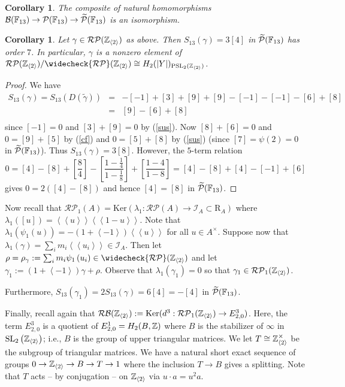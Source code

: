 \documentclass[12pt]{amsart}
\newtheorem{cor}[lem]{Corollary}
\theoremstyle{definition}
\newcommand{\F}[1]{\Bbb{F}_{#1}}
\newcommand{\Z}{\Bbb{Z}}
\newcommand{\spl}[2]{\operatorname{SL}_{#1}\left(#2\right)}
\newcommand{\pspl}[2]{\mathrm{PSL}_{#1}(#2)}
\newcommand{\pb}[1]{\mathcal{P}(#1)}%
\newcommand{\qpb}[1]{\widetilde{\mathcal{P}}(#1)}%
\newcommand{\rpb}[1]{\mathcal{RP}(#1)}%
\newcommand{\rpbker}[1]{\mathcal{RP}_1(#1)}%
\newcommand{\crpb}[1]{\widecheck{\mathcal{RP}}(#1)}
\newcommand{\bl}[1]{\mathcal{B}(#1)}%
\newcommand{\rbl}[1]{{\mathcal{RB}}(#1)}%
\newcommand{\gpb}[1]{\left[ #1\right]} %
\newcommand{\sus}[1]{\psi(#1) }%
\newcommand{\suss}[2]{\psi_{#1}\left( #2\right)}
\newcommand{\<}{\langle}
\renewcommand{\>}{\rangle}
\renewcommand{\ker}[1]{\mathrm{Ker}(#1)}
\newcommand{\sgr}[1]{\mathrm{R}_{#1}}%
\newcommand{\an}[1]{\left\langle{#1}\right\rangle}
\newcommand{\pf}[1]{\left\langle\!\left\langle{#1}\right\rangle\!\right\rangle}
\newcommand{\aug}[1]{\mathcal{I}_{#1}}
\begin{document}
\begin{cor}  The composite of natural homomorphisms $\bl{\F{13}}\to\pb{\F{13}}\to\qpb{\F{13}}$ is an isomorphism.
\end{cor}

\begin{cor}  Let $\gamma\in \rpb{\Z_{\an{2}}}$ as above. Then $S_{13}(\gamma)=3\gpb{4}$ in $\qpb{\F{13}}$ has order $7$. In particular, $\gamma$ is a nonzero element of
$\rpb{\Z_{\an{2}}}/\crpb{\Z_{\an{2}}}\cong H_2(|Y|)_{\pspl{2}{\Z_{\an{2}}}}$.
\end{cor}

\begin{proof} We have 
\begin{eqnarray*}
S_{13}(\gamma)=S_{13}(D(\tilde{\gamma}))&=&-\gpb{-1}+\gpb{3}+\gpb{9}+\gpb{9}-\gpb{-1}-\gpb{-1}-\gpb{6}+\gpb{8}\\
&=& \gpb{9}-\gpb{6}+\gpb{8}\\
\end{eqnarray*}
since $\gpb{-1}=0$ and $\gpb{3}+\gpb{9}=0$ by (\ref{sus}). Now $\gpb{8}+\gpb{6}=0$  and $0=\gpb{9}+\gpb{5}$ by (\ref{cf}) and $0=\gpb{5}+\gpb{8}$ by (\ref{sus}) (since $\gpb{7}=\sus{2}=0$ in $\qpb{\F{13}}$). Thus $S_{13}(\gamma)=3\gpb{8}$. However, the $5$-term relation
\[
0=\gpb{4}-\gpb{8}+\gpb{\frac{8}{4}}-\gpb{\frac{1-\frac{1}{4}}{1-\frac{1}{8}}}+\gpb{\frac{1-4}{1-8}}=\gpb{4}-\gpb{8}+\gpb{4}-\gpb{-1}+\gpb{6}
\]
gives $0=2(\gpb{4}-\gpb{8})$  and hence $\gpb{4}=\gpb{8}$ in $\qpb{\F{13}}$.
\end{proof}

Now recall that $\rpbker{A}=\ker{\lambda_1:\rpb{A}\to \aug{A}\subset\sgr{A}}$ where $\lambda_1(\gpb{u})=\pf{u}\pf{1-u}$. Note that $\lambda_1(\suss{1}{u})=-(1+\an{-1})\pf{u}$ for all 
$u\in A^\times$. Suppose now that $\lambda_1(\gamma)=\sum_im_i\pf{u_i}\in\aug{A}$. Then let $\rho=\rho_\gamma:=\sum_im_i\suss{1}{u_i}\in \crpb{\Z_{\an{2}}}$ and let\\ 
$\gamma_1:=(1+\an{-1})\gamma+\rho$. Observe that $\lambda_1(\gamma_1)=0$ so that $\gamma_1\in \rpbker{\Z_{\an{2}}}$. 

Furthermore, $S_{13}(\gamma_1)=2S_{13}(\gamma)=6\gpb{4}=-\gpb{4}$ in $\qpb{\F{13}}$.

Finally, recall again that $\rbl{\Z_{\an{2}}}:=\ker{d^3: \rpbker{\Z_{\an{2}}}\to E^3_{2,0}}$. Here, the term $E^3_{2,0}$ is a quotient of $E^1_{2,0}=H_2(B,\Z)$ where 
$B$ is the stabilizer of $\infty$ in $\spl{2}{\Z_{\an{2}}}$; i.e., $B$ is the group of upper triangular matrices. We let $T\cong \Z_{\an{2}}^\times$ be the subgroup of 
triangular matrices. We have a natural short exact sequence of groups $0\to \Z_{\an{2}}\to B\to T\to 1$ where the inclusion $T\to B$ gives a splitting. Note that $T$ acts -- by conjugation -- on $\Z_{\an{2}}$ via $u\cdot a=u^2a$.
\end{document}
